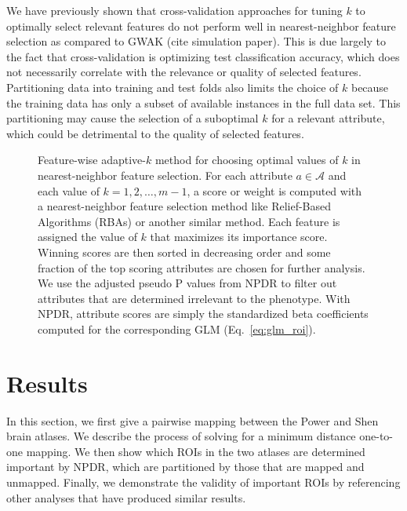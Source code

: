 \documentclass[10pt,letterpaper]{article}\usepackage[]{graphicx}\usepackage[]{color}
\begin{document}
We have previously shown that cross-validation approaches for tuning $k$ to optimally select relevant features do not perform well in nearest-neighbor feature selection as compared to GWAK (cite simulation paper). This is due largely to the fact that cross-validation is optimizing test classification accuracy, which does not necessarily correlate with the relevance or quality of selected features. Partitioning data into training and test folds also limits the choice of $k$ because the training data has only a subset of available instances in the full data set. This partitioning may cause the selection of a suboptimal $k$ for a relevant attribute, which could be detrimental to the quality of selected features.

\begin{figure}[h!]
	\centering
	\caption{Feature-wise adaptive-$k$ method for choosing optimal values of $k$ in nearest-neighbor feature selection. For each attribute $a \in \mathcal{A}$ and each value of $k=1,2,\dots,m-1$, a score or weight is computed with a nearest-neighbor feature selection method like Relief-Based Algorithms (RBAs) or another similar method. Each feature is assigned the value of $k$ that maximizes its importance score. Winning scores are then sorted in decreasing order and some fraction of the top scoring attributes are chosen for further analysis. We use the adjusted pseudo P values from NPDR to filter out attributes that are determined irrelevant to the phenotype. With NPDR, attribute scores are simply the standardized beta coefficients computed for the corresponding GLM (Eq.~\ref{eq:glm_roi}).}\label{fig:gwak}
\end{figure}

\section{Results}
In this section, we first give a pairwise mapping between the Power and Shen brain atlases. We describe the process of solving for a minimum distance one-to-one mapping. We then show which ROIs in the two atlases are determined important by NPDR, which are partitioned by those that are mapped and unmapped. Finally, we demonstrate the validity of important ROIs by referencing other analyses that have produced similar results.
\end{document}
